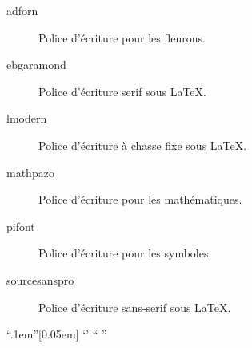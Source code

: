 \begin{description}
	\item[adforn] Police d'écriture pour les fleurons.
	\item[ebgaramond] Police d'écriture serif sous \LaTeX.
	\item[lmodern] Police d'écriture à chasse fixe sous \LaTeX.
	\item[mathpazo] Police d'écriture pour les mathématiques.
	\item[pifont] Police d'écriture pour les symboles.
	\item[sourcesanspro] Police d'écriture sans-serif sous \LaTeX.
\end{description}
\egroup

\begin{noprint}
\RequirePackage{etoolbox,environ,fmtcount,graphicx,numprint,ragged2e,xurl,xcolor,xspace}
\end{noprint}

\begin{noprint}
\if@french
\else\if@british
\else\if@english
\fi\fi\fi
\RequirePackage{frenchlaw-babel}
\RequirePackage{fixltxhyph}
\end{noprint}

\begin{noprint}
\RequirePackage[autostyle=true]{csquotes}
	{\textquotedblleft}{\kern.1em\textquotedblright}[0.05em]
	{\textquoteleft}{\textquoteright}
  {\mkfrenchopenquote{\guillemotleft}\em}
  {\em\mkfrenchclosequote{\guillemotright}}
  {\textquotedblleft}
  {\textquotedblright}
\end{noprint}

